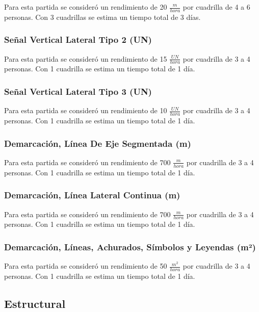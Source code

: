 \documentclass{article} %
\begin{document}
Para esta partida se consideró un rendimiento de 20 $\frac{m}{hora}$ por cuadrilla de 4 a 6 personas. Con 3 cuadrillas se estima un tiempo total de 3 días.

\subsubsection{Señal Vertical Lateral Tipo 2 (UN)}

Para esta partida se consideró un rendimiento de 15 $\frac{UN}{hora}$ por cuadrilla de 3 a 4 personas. Con 1 cuadrilla se estima un tiempo total de 1 día.

\subsubsection{Señal Vertical Lateral Tipo 3 (UN)}

Para esta partida se consideró un rendimiento de 10 $\frac{UN}{hora}$ por cuadrilla de 3 a 4 personas. Con 1 cuadrilla se estima un tiempo total de 1 día.

\subsubsection{Demarcación, Línea De Eje Segmentada (m)}
Para esta partida se consideró un rendimiento de 700 $\frac{m}{hora}$ por cuadrilla de 3 a 4 personas. Con 1 cuadrilla se estima un tiempo total de 1 día.


\subsubsection{Demarcación, Línea Lateral Continua (m)}

Para esta partida se consideró un rendimiento de 700 $\frac{m}{hora}$ por cuadrilla de 3 a 4 personas. Con 1 cuadrilla se estima un tiempo total de 1 día.

\subsubsection{Demarcación, Líneas, Achurados, Símbolos y Leyendas (m²)}

Para esta partida se consideró un rendimiento de 50 $\frac{m^2}{hora}$ por cuadrilla de 3 a 4 personas. Con 1 cuadrilla se estima un tiempo total de 1 día.

\subsection{Estructural}
\end{document}
